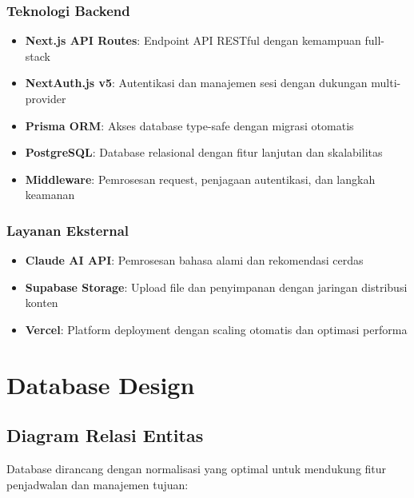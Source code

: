 \subsubsection{Teknologi Backend}

\begin{itemize}
\item \textbf{Next.js API Routes}: Endpoint API RESTful dengan kemampuan full-stack
\item \textbf{NextAuth.js v5}: Autentikasi dan manajemen sesi dengan dukungan multi-provider
\item \textbf{Prisma ORM}: Akses database type-safe dengan migrasi otomatis
\item \textbf{PostgreSQL}: Database relasional dengan fitur lanjutan dan skalabilitas
\item \textbf{Middleware}: Pemrosesan request, penjagaan autentikasi, dan langkah keamanan
\end{itemize}

\subsubsection{Layanan Eksternal}

\begin{itemize}
\item \textbf{Claude AI API}: Pemrosesan bahasa alami dan rekomendasi cerdas
\item \textbf{Supabase Storage}: Upload file dan penyimpanan dengan jaringan distribusi konten
\item \textbf{Vercel}: Platform deployment dengan scaling otomatis dan optimasi performa
\end{itemize}

\section{Database Design}

\subsection{Diagram Relasi Entitas}

Database dirancang dengan normalisasi yang optimal untuk mendukung fitur penjadwalan dan manajemen tujuan:

